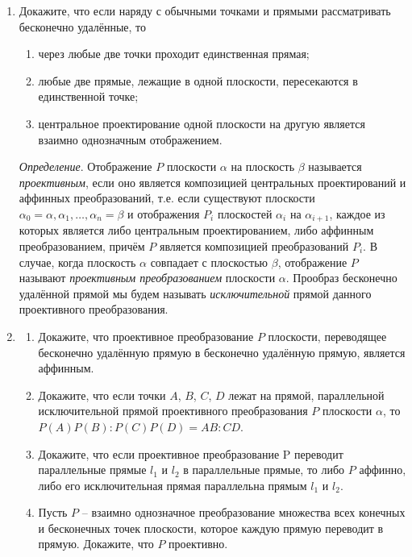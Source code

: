 \begin{enumerate}
		\item Докажите, что если наряду с обычными точками и прямыми рассматривать бесконечно удалённые, то
		\begin{enumerate}
			\item через любые две точки проходит единственная прямая;
			\item любые две прямые, лежащие в одной плоскости, пересекаются в единственной точке;
			\item центральное проектирование одной плоскости на другую является взаимно однозначным отображением.
		\end{enumerate}
 
		\textit{Определение}. Отображение $P$ плоскости $\alpha$ на плоскость $\beta$ называется \textit{проективным}, если оно является композицией центральных проектирований и аффинных преобразований, т.е. если существуют плоскости $\alpha_0 = \alpha, \alpha_1, \ldots, \alpha_n = \beta$ и отображения $P_i$ плоскостей $\alpha_i$ на $\alpha_{i+1}$, каждое из которых является либо центральным проектированием, либо аффинным преобразованием, причём $P$ является композицией преобразований $P_i$. В случае, когда плоскость $\alpha$ совпадает с плоскостью $\beta$, отображение $P$ называют \textit{проективным преобразованием} плоскости $\alpha$. Прообраз бесконечно удалённой прямой мы будем называть \textit{исключительной} прямой данного проективного преобразования.
 
		\item
		\begin{enumerate}
			\item Докажите, что проективное преобразование $P$ плоскости, переводящее бесконечно удалённую прямую в бесконечно удалённую прямую, является аффинным.
 
			\item Докажите, что если точки $A$, $B$, $C$, $D$ лежат на прямой, параллельной исключительной прямой проективного преобразования $P$ плоскости $\alpha$, то $P(A)P(B) : P(C)P(D) = AB : CD$.
			
			\item Докажите, что если проективное преобразование P переводит параллельные прямые $l_1$ и $l_2$ в параллельные прямые, то либо $P$ аффинно, либо его исключительная прямая параллельна прямым $l_1$ и $l_2$.
			\item Пусть $P$ -- взаимно однозначное преобразование множества всех конечных и бесконечных точек плоскости, которое каждую прямую переводит в прямую. Докажите, что $P$ проективно.
		\end{enumerate}
 

\end{enumerate}
